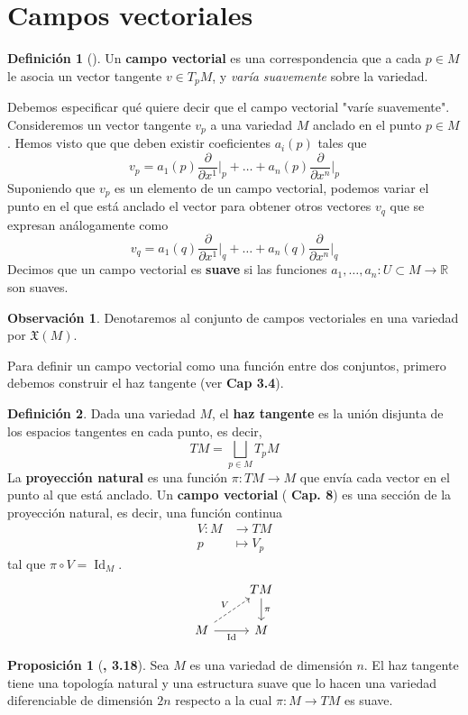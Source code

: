 \documentclass[spanish]{book}
\theoremstyle{definition}
\newtheorem*{defn}{Definición}
\newtheorem*{prop}{Proposición}
\newtheorem*{obs}{Observación}
\newcommand{\R}{\mathbb{R}}
\DeclareMathOperator{\Id}{Id}
\begin{document}
\section{Campos vectoriales}
\begin{defn}[\cite{ONeill}]
	Un \textbf{campo vectorial} es una correspondencia que a cada $p\in M$ le asocia un vector tangente $v\in T_pM$, y \textit{varía suavemente} sobre la variedad.
\end{defn}
Debemos especificar qué quiere decir que el campo vectorial "varíe suavemente". Consideremos un vector tangente $v_p$ a una variedad $M$ anclado en el punto $p\in M$. Hemos visto que que deben existir coeficientes $a_i(p)$ tales que
\[v_p=a_1(p)\frac{\partial}{\partial x^1}\Big|_p+\ldots+a_n(p)\frac{\partial}{\partial x^n}\Big|_p\]
Suponiendo que $v_p$ es un elemento de un campo vectorial, podemos variar el punto en el que está anclado el vector para obtener otros vectores $v_q$ que se expresan análogamente como
\[v_q=a_1(q)\frac{\partial}{\partial x^1}\Big|_q+\ldots+a_n(q)\frac{\partial}{\partial x^n}\Big|_q\]
Decimos que un campo vectorial es \textbf{suave} si las funciones $a_1,\ldots,a_n:U\subset M\to\R$ son suaves.
\begin{obs}
	Denotaremos al conjunto de campos vectoriales en una variedad por $\mathfrak{X}(M)$.
\end{obs}
Para definir un campo vectorial como una función entre dos conjuntos, primero debemos construir el haz tangente (ver \cite{Lee} \textbf{Cap 3.4}).
\begin{defn}
	Dada una variedad $M$, el \textbf{haz tangente} es la unión disjunta de los espacios tangentes en cada punto, es decir,
	\[TM=\bigsqcup_{p\in M}T_pM\]
	La \textbf{proyección natural} es una función $\pi:TM\to M$ que envía cada vector en el punto al que está anclado.
	Un \textbf{campo vectorial} (\cite{Lee} \textbf{Cap. 8}) es una sección de la proyección natural, es decir, una función continua
	\begin{align*}
		V:M&\to TM\\
		p&\mapsto V_p
	\end{align*}
	tal que $\pi\circ V=\Id_M$.
	\[\begin{tikzcd}
		&TM\arrow{d}{\pi}\\
		M\arrow[dashed]{ur}{V}\arrow[swap]{r}{\Id}&M
	\end{tikzcd}\]
\end{defn}
\begin{prop}[\cite{Lee}\textbf{, 3.18}]
	Sea $M$ es una variedad de dimensión $n$. El haz tangente tiene una topología natural y una estructura suave que lo hacen una variedad diferenciable de dimensión $2n$ respecto a la cual $\pi:M\to TM$ es suave.
\end{prop}
\end{document}
